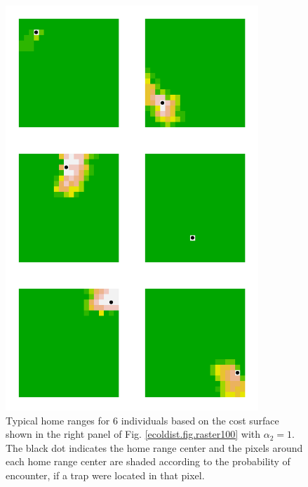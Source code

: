 \begin{figure}
\begin{center}
\includegraphics[height=6in,width=3.75in]{Ch12-EcolDist/figs/home_ranges}
\end{center}
\caption{
Typical home ranges for 6 individuals based on the cost surface shown in the right panel of
  Fig. \ref{ecoldist.fig.raster100} with $\alpha_{2}=1$. The black dot indicates the home
  range center and the pixels around each home range center are shaded
according to the probability of encounter, if a trap were located in
that pixel.
}
\label{fig.homeranges}
\end{figure}


